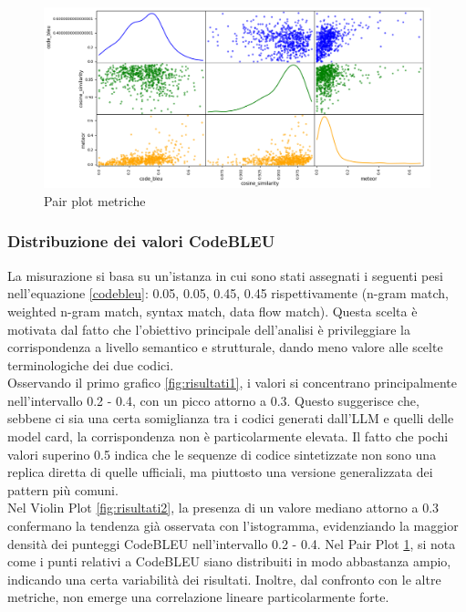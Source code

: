 \documentclass{article}
\begin{document}
\begin{figure}[htbp]
    \centering
    \includegraphics[width=\textwidth]{img/risultati3.png}
    \caption{Pair plot metriche}
    \label{fig:risultati3}
\end{figure}

\subsubsection{Distribuzione dei valori CodeBLEU}
La misurazione si basa su un'istanza in cui sono stati assegnati i seguenti pesi nell'equazione \ref{codebleu}: 0.05, 0.05, 0.45, 0.45 rispettivamente (n-gram match, weighted n-gram match, syntax match, data flow match). Questa scelta è motivata dal fatto che l’obiettivo principale dell’analisi è privileggiare la corrispondenza a livello semantico e strutturale, dando meno valore alle scelte terminologiche dei due codici.\\
Osservando il primo grafico \ref{fig:risultati1}, i valori si concentrano principalmente nell’intervallo 0.2 - 0.4, con un picco attorno a 0.3. Questo suggerisce che, sebbene ci sia una certa somiglianza tra i codici generati dall’LLM e quelli delle model card, la corrispondenza non è particolarmente elevata. Il fatto che pochi valori superino 0.5 indica che le sequenze di codice sintetizzate non sono una replica diretta di quelle ufficiali, ma piuttosto una versione generalizzata dei pattern più comuni.\\
Nel Violin Plot \ref{fig:risultati2}, la presenza di un valore mediano attorno a 0.3 confermano la tendenza già osservata con l’istogramma, evidenziando la maggior densità dei punteggi CodeBLEU nell’intervallo 0.2 - 0.4. Nel Pair Plot \ref{fig:risultati3}, si nota come i punti relativi a CodeBLEU siano distribuiti in modo abbastanza ampio, indicando una certa variabilità dei risultati. Inoltre, dal confronto con le altre metriche, non emerge una correlazione lineare particolarmente forte.
\end{document}
